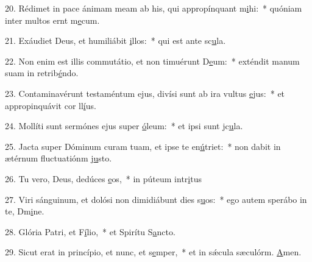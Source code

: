 20. Rédimet in pace ánimam meam ab his, qui appropínquant m\uline{i}hi:~* quóniam inter multos ernt m\uline{e}cum.\par 
21. Exáudiet Deus, et humiliábit \uline{i}llos:~* qui est ante sc\uline{u}la.\par 
22. Non enim est illis commutátio, et non timuérunt D\uline{e}um:~* exténdit manum suam in retrib\uline{é}ndo.\par 
23. Contaminavérunt testaméntum ejus, divísi sunt ab ira vultus \uline{e}jus:~* et appropinquávit cor ll\uline{í}us.\par 
24. Mollíti sunt sermónes ejus super \uline{ó}leum:~* et ipsi sunt jc\uline{u}la.\par 
25. Jacta super Dóminum curam tuam, et ipse te en\uline{ú}triet:~* non dabit in ætérnum fluctuatiónm j\uline{u}sto.\par 
26. Tu vero, Deus, dedúces \uline{e}os,~* in púteum intr\uline{i}tus\par 
27. Viri sánguinum, et dolósi non dimidiábunt dies s\uline{u}os:~* ego autem sperábo in te, Dm\uline{i}ne.\par 
28. Glória Patri, et F\uline{í}lio,~* et Spirítu S\uline{a}ncto.\par 
29. Sicut erat in princípio, et nunc, et s\uline{e}mper,~* et in sǽcula sæculórm. \uline{A}men.\par 
